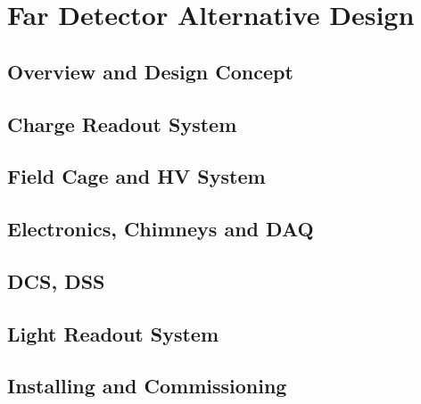 \chapter{Far Detector Alternative Design}
\label{ch:detectors-fd-alt}

\section{Overview and Design Concept}
\label{sec:detectors-fd-alt-overview}

\section{Charge Readout System}
\label{sec:detectors-fd-alt-readout}

\section{Field Cage and HV System}
\label{sec:detectors-fd-alt-hv}

\section{Electronics, Chimneys and DAQ}
\label{sec:detectors-fd-alt-daq}

\section{DCS, DSS}
\label{sec:detectors-fd-alt-dcsdss}

\section{Light Readout System}
\label{sec:detectors-fd-alt-optical}

\section{Installing and Commissioning}
\label{sec:detectors-fd-alt-install}
